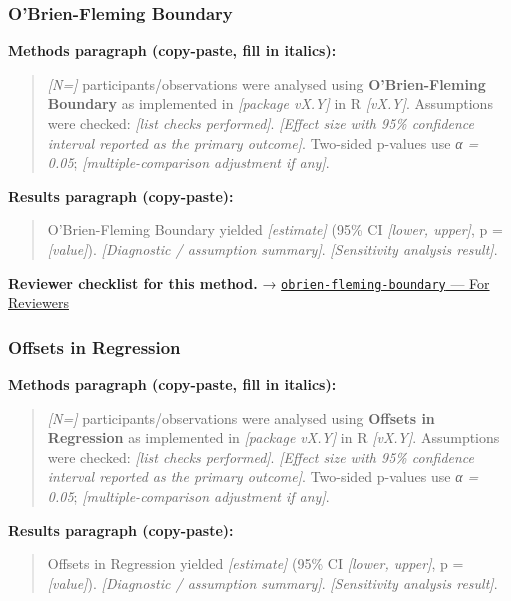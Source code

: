 \documentclass[
]{article}
\begin{document}
\subsubsection{O'Brien-Fleming Boundary}\label{obrien-fleming-boundary}

\textbf{Methods paragraph (copy-paste, fill in italics):}

\begin{quote}
\emph{{[}N={]}} participants/observations were analysed using
\textbf{O'Brien-Fleming Boundary} as implemented in \emph{{[}package
vX.Y{]}} in R \emph{{[}vX.Y{]}}. Assumptions were checked: \emph{{[}list
checks performed{]}}. \emph{{[}Effect size with 95\% confidence interval
reported as the primary outcome{]}}. Two-sided p-values use \emph{α =
0.05}; \emph{{[}multiple-comparison adjustment if any{]}}.
\end{quote}

\textbf{Results paragraph (copy-paste):}

\begin{quote}
O'Brien-Fleming Boundary yielded \emph{{[}estimate{]}} (95\% CI
\emph{{[}lower, upper{]}}, p = \emph{{[}value{]}}). \emph{{[}Diagnostic
/ assumption summary{]}}. \emph{{[}Sensitivity analysis result{]}}.
\end{quote}

\textbf{Reviewer checklist for this method.} →
\href{../chapters/14-clinical/obrien-fleming-boundary.Rmd\#for-reviewers}{\texttt{obrien-fleming-boundary}
--- For Reviewers}

\subsubsection{Offsets in Regression}\label{offsets-in-regression}

\textbf{Methods paragraph (copy-paste, fill in italics):}

\begin{quote}
\emph{{[}N={]}} participants/observations were analysed using
\textbf{Offsets in Regression} as implemented in \emph{{[}package
vX.Y{]}} in R \emph{{[}vX.Y{]}}. Assumptions were checked: \emph{{[}list
checks performed{]}}. \emph{{[}Effect size with 95\% confidence interval
reported as the primary outcome{]}}. Two-sided p-values use \emph{α =
0.05}; \emph{{[}multiple-comparison adjustment if any{]}}.
\end{quote}

\textbf{Results paragraph (copy-paste):}

\begin{quote}
Offsets in Regression yielded \emph{{[}estimate{]}} (95\% CI
\emph{{[}lower, upper{]}}, p = \emph{{[}value{]}}). \emph{{[}Diagnostic
/ assumption summary{]}}. \emph{{[}Sensitivity analysis result{]}}.
\end{quote}
\end{document}
